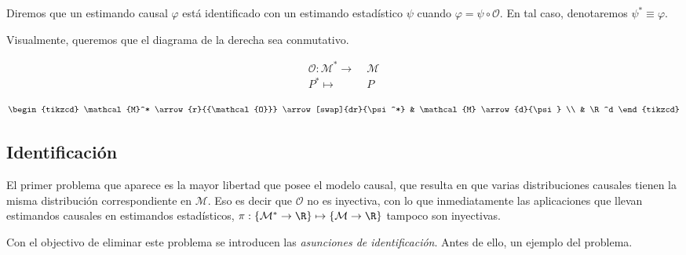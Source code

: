 \begin{definicion}[Identificación]
	Diremos que un estimando causal $\varphi$ está identificado con un estimando estadístico $\psi$ cuando
	$ \varphi = \psi \circ \mathcal{O}$.
	En tal caso, denotaremos $\psi^* \equiv \varphi$.
\end{definicion}

Visualmente, queremos que el diagrama de la derecha sea conmutativo.

\begin{minipage}{0.45\textwidth}
	\centering
	\begin{align*}
		\mathcal{O}: \mathcal{M}^* \to & \; \mathcal{M} \\
		P^* \mapsto                    & \; P
	\end{align*}
\end{minipage}
\hfill
\begin{minipage}{0.45\textwidth}
	\centering
	$$
		\begin{tikzcd}
			\mathcal{M}^* \arrow{r}{{\mathcal{O}}} \arrow[swap]{dr}{\psi^*} & \mathcal{M} \arrow{d}{\psi} \\
			& \R^d
		\end{tikzcd}
	$$
\end{minipage}

%



\subsection{Identificación}

El primer problema que aparece es la mayor libertad que posee el modelo causal, que resulta en
que varias distribuciones causales tienen la misma distribución correspondiente en $\mathcal{M}$.
Eso es decir que $\mathcal{O}$ no es inyectiva, con lo que inmediatamente
las aplicaciones que llevan estimandos causales en estimandos estadísticos,
$\pi: \left\{\mathcal{M}^* \to \R \right\} \mapsto \left\{\mathcal{M} \to \R \right\}$ tampoco son inyectivas.

Con el objectivo de eliminar este problema se introducen las \textit{asunciones de identificación}.
Antes de ello, un ejemplo del problema.

